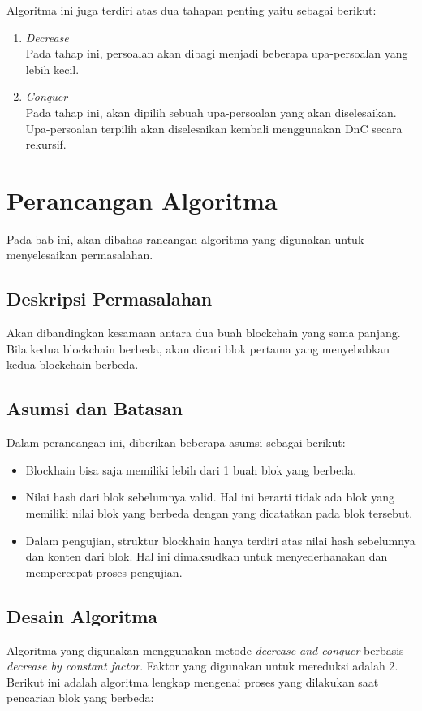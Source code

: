 \documentclass[10pt,conference]{IEEEtran}
\theoremstyle{definition}
\begin{document}
Algoritma ini juga terdiri atas dua tahapan penting yaitu sebagai berikut:
\begin{enumerate}
    \item \emph{Decrease} \\
    Pada tahap ini, persoalan  akan dibagi menjadi beberapa upa-persoalan yang lebih kecil.
    \item \emph{Conquer} \\
    Pada tahap ini, akan dipilih sebuah upa-persoalan yang akan diselesaikan. Upa-persoalan terpilih akan diselesaikan kembali menggunakan DnC secara  rekursif.
\end{enumerate}

\section{Perancangan Algoritma}

Pada bab ini, akan dibahas rancangan algoritma yang digunakan untuk menyelesaikan permasalahan.

\subsection{Deskripsi Permasalahan}
Akan dibandingkan kesamaan antara dua buah blockchain yang sama panjang. Bila kedua blockchain berbeda, akan dicari blok pertama yang menyebabkan kedua blockchain berbeda. 

\subsection{Asumsi dan Batasan}
Dalam perancangan ini, diberikan beberapa asumsi sebagai berikut:
\begin{itemize}
    \item Blockhain bisa saja memiliki lebih dari 1 buah blok yang berbeda.
    \item Nilai hash dari blok sebelumnya valid. Hal ini berarti tidak ada blok yang memiliki nilai blok yang berbeda dengan yang dicatatkan pada blok tersebut.
    \item Dalam pengujian, struktur blockhain hanya terdiri atas nilai hash sebelumnya dan konten dari blok. Hal ini dimaksudkan untuk menyederhanakan dan mempercepat proses pengujian.
\end{itemize}

\subsection{Desain Algoritma}
Algoritma yang digunakan menggunakan metode \emph{decrease and conquer} berbasis \emph{decrease by constant factor}. Faktor yang  digunakan untuk mereduksi adalah 2. Berikut ini adalah algoritma lengkap mengenai proses yang dilakukan saat pencarian blok yang berbeda:
\end{document}

